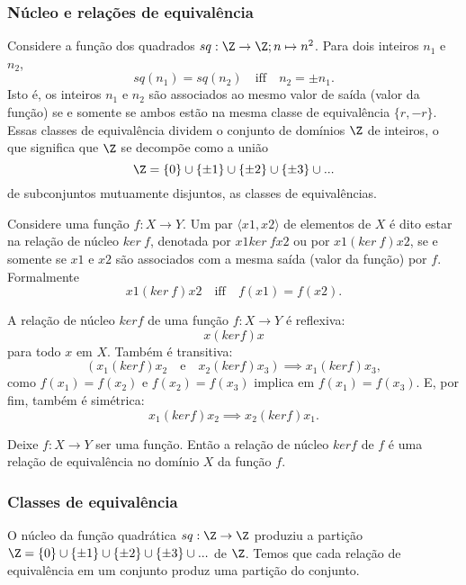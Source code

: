       \subsubsection{Núcleo e relações de equivalência}
         Considere a função dos quadrados $sq: \Z \to \Z; n\mapsto n^{2}$. Para dois inteiros $n_{1}$ e $n_{2}$, $$sq(n_{1}) = sq(n_{2})\quad \textrm{iff}\quad n_{2} = \pm n_{1}.$$
         Isto é, os inteiros $n_{1}$ e $n_{2}$ são associados ao mesmo valor de saída (valor da função) se e somente se ambos estão na mesma classe de equivalência $\{r, -r\}$. Essas classes de equivalência dividem o conjunto de domínios $\Z$ de inteiros, o que significa que $\Z$ se decompõe como a união 
         $$ \Z = \{0\} \cup \{\pm 1\} \cup \{\pm 2\} \cup \{\pm 3\} \cup ...$$
         de subconjuntos mutuamente disjuntos, as classes de equivalências.
         \begin{definition}
            Considere uma função $f: X \to Y$. Um par $\langle x{1}, x{2} \rangle$ de elementos de $X$ é dito estar na relação de núcleo $ker\ f$, denotada por $x{1} ker\ f x{2}$ ou por $x{1} (ker\ f) x{2}$, se e somente se $x{1}$ e $x{2}$ são associados com a mesma saída (valor da função) por $f$. Formalmente
            $$ x{1} (ker\ f) x{2}\quad \textrm{iff}\quad f(x{1}) = f(x{2}).$$
         \end{definition}
         A relação de núcleo $ker f$ de uma função $f: X \to Y$ é reflexiva: $$ x (ker f) x$$ para todo $x$ em $X$. Também é transitiva: $$\left(x_{1} (ker f) x_{2}\quad \textrm{e}\quad x_{2} (ker f) x_{3}\right) \implies x_{1} (ker f) x_{3},$$ como $f(x_{1}) = f(x_{2})$ e $f(x_{2}) = f(x_{3})$ implica em $f(x_{1}) = f(x_{3}).$ E, por fim, também é simétrica: $$ x_{1} (ker f) x_{2} \implies x_{2} (ker f) x_{1}.$$
         \begin{stat}
            Deixe $f: X \to Y$ ser uma função. Então a relação de núcleo $ker f$ de $f$ é uma relação de equivalência no domínio $X$ da função $f$.
         \end{stat}

      \subsubsection{Classes de equivalência}
         O núcleo da função quadrática $sq: \Z \to \Z$ produziu a partição $ \Z = \{0\} \cup \{\pm 1\} \cup \{\pm 2\} \cup \{\pm 3\} \cup ...$ de $\Z$. Temos que cada relação de equivalência em um conjunto produz uma partição do conjunto.

